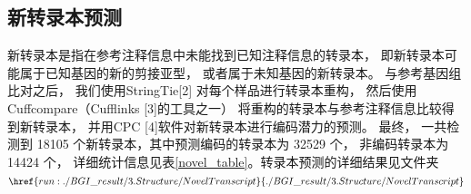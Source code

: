 \documentclass[10pt, oneside,a4paper]{article}
\begin{document}
\subsection{新转录本预测}
新转录本是指在参考注释信息中未能找到已知注释信息的转录本， 即新转录本可能属于已知基因的新的剪接亚型， 或者属于未知基因的新转录本。 与参考基因组比对之后， 我们使用StringTie[2] 对每个样品进行转录本重构， 然后使用Cuffcompare（Cufflinks [3]的工具之一） 将重构的转录本与参考注释信息比较得到新转录本， 并用CPC [4]软件对新转录本进行编码潜力的预测。 最终， 一共检测到 18105 个新转录本，其中预测编码的转录本为 32529 个， 非编码转录本为 14424 个， 详细统计信息见表\ref{novel_table}。转录本预测的详细结果见文件夹$\href{run:./BGI\_result/3.Structure/NovelTranscript}{./BGI\_result/3.Structure/NovelTranscript}$\par
\begin{table}[H]
\centering
{}
\end{table}
\par
\vspace{5 mm}
\end{document}
